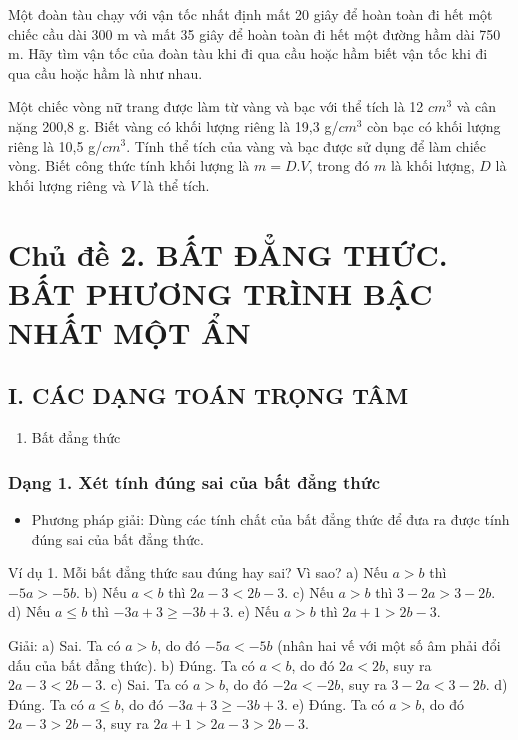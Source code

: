 \documentclass[%
    fontsize=12pt,%
    chapterprefix=false,%
    open=right,%
    twoside=false,%
    numbers=noenddot,%
    headings=optiontohead,%
    final,%
    DIV=15,%
    parskip=half %
]{scrbook}
\begin{document}
\begin{tuluan}
\item Một đoàn tàu chạy với vận tốc nhất định mất 20 giây để hoàn toàn đi hết một chiếc cầu dài 300 m và mất 35 giây để hoàn toàn đi hết một đường hầm dài 750 m. Hãy tìm vận tốc của đoàn tàu khi đi qua cầu hoặc hầm biết vận tốc khi đi qua cầu hoặc hầm là như nhau.

\item Một chiếc vòng nữ trang được làm từ vàng và bạc với thể tích là 12 $cm^3$ và cân nặng 200,8 g. Biết vàng có khối lượng riêng là 19,3 g/$cm^3$ còn bạc có khối lượng riêng là 10,5 g/$cm^3$. Tính thể tích của vàng và bạc được sử dụng để làm chiếc vòng. Biết công thức tính khối lượng là $ m = D.V $, trong đó $ m $ là khối lượng, $ D $ là khối lượng riêng và $ V $ là thể tích.

\end{tuluan}

\section{Chủ đề 2. BẤT ĐẲNG THỨC. BẤT PHƯƠNG TRÌNH BẬC NHẤT MỘT ẨN}
\subsection{I. CÁC DẠNG TOÁN TRỌNG TÂM}

\begin{enumerate}
  \item Bất đẳng thức
\end{enumerate}
\subsubsection{Dạng 1. Xét tính đúng sai của bất đẳng thức}

\begin{itemize}
  \item Phương pháp giải: Dùng các tính chất của bất đẳng thức để đưa ra được tính đúng sai của bất đẳng thức.
\end{itemize}

Ví dụ 1. Mỗi bất đẳng thức sau đúng hay sai? Vì sao? a) Nếu $ a > b $ thì $ -5a > -5b $. b) Nếu $ a < b $ thì $ 2a - 3 < 2b - 3 $. c) Nếu $ a > b $ thì $ 3 - 2a > 3 - 2b $. d) Nếu $ a \leq b $ thì $ -3a + 3 \geq -3b + 3 $. e) Nếu $ a > b $ thì $ 2a + 1 > 2b - 3 $.

Giải: a) Sai. Ta có $ a > b $, do đó $ -5a < -5b $ (nhân hai vế với một số âm phải đổi dấu của bất đẳng thức). b) Đúng. Ta có $ a < b $, do đó $ 2a < 2b $, suy ra $ 2a - 3 < 2b - 3 $. c) Sai. Ta có $ a > b $, do đó $ -2a < -2b $, suy ra $ 3 - 2a < 3 - 2b $. d) Đúng. Ta có $ a \leq b $, do đó $ -3a + 3 \geq -3b + 3 $. e) Đúng. Ta có $ a > b $, do đó $ 2a - 3 > 2b - 3 $, suy ra $ 2a + 1 > 2a - 3 > 2b - 3 $.
\end{document}
